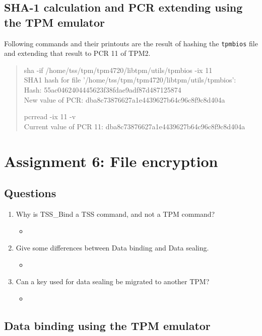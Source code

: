 \documentclass[10pt]{article}
\begin{document}
\subsection{SHA-1 calculation and PCR extending using the TPM emulator}
Following commands and their printouts are the result of hashing the 
\texttt{tpmbios} file and extending that result to PCR 11 of TPM2.
\begin{quote}
sha -if /home/tss/tpm/tpm4720/libtpm/utils/tpmbios -ix 11\\
SHA1 hash for file '/home/tss/tpm/tpm4720/libtpm/utils/tpmbios': \\
Hash: 55ac0462404445623f38fdae9adf87d487125874\\
New value of PCR: dba8c73876627a1e4439627b64c96c8f9c8d404a

pcrread -ix 11 -v \\
Current value of PCR 11: dba8c73876627a1e4439627b64c96c8f9c8d404a
\end{quote}

\section{Assignment 6: File encryption}
\subsection{Questions}
\begin{enumerate}
    \item {Why is TSS\_Bind a TSS command, and not a TPM command?}
    \begin{itemize}
        \item {}
    \end{itemize}
    \item {Give some differences between Data binding and Data sealing.}
    \begin{itemize}
        \item {}
    \end{itemize}
    \item {Can a key used for data sealing be migrated to another TPM?}
    \begin{itemize}
        \item {}
    \end{itemize}
\end{enumerate}
\subsection{Data binding using the TPM emulator}
\end{document}
